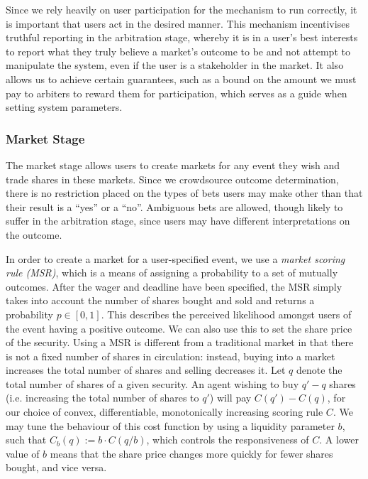 \documentclass[10pt,a4paper]{article}
\theoremstyle{plain}
\theoremstyle{definition}
\begin{document}
Since we rely heavily on user participation for the mechanism to run correctly,
it is important that users act in the desired manner. This mechanism
incentivises truthful reporting in the arbitration stage, whereby it is in a
user's best interests to report what they truly believe a market's outcome to
be and not attempt to manipulate the system, even if the user is a stakeholder
in the market. It also allows us to achieve certain guarantees, such as a bound
on the amount we must pay to arbiters to reward them for participation, which
serves as a guide when setting system parameters.

\subsubsection{Market Stage}

The market stage allows users to create markets for any event they wish and
trade shares in these markets. Since we crowdsource outcome determination,
there is no restriction placed on the types of bets users may make other than
that their result is a ``yes'' or a ``no''. Ambiguous bets are allowed, though
likely to suffer in the arbitration stage, since users may have different
interpretations on the outcome.

In order to create a market for a user-specified event, we use a \emph{market
scoring rule (MSR)}, which is a means of assigning a probability to a set of
mutually outcomes. After the wager and deadline have been specified, the MSR
simply takes into account the number of shares bought and sold and returns a
probability $p \in [0,1]$. This describes the perceived likelihood amongst
users of the event having a positive outcome. We can also use this to set the
share price of the security.  Using a MSR is different from a traditional
market in that there is not a fixed number of shares in circulation: instead,
buying into a market increases the total number of shares and selling decreases
it. Let $q$ denote the total number of shares of a given security. An agent
wishing to buy $q'-q$ shares (i.e. increasing the total number of shares to
$q'$) will pay $C(q')-C(q)$, for our choice of convex, differentiable,
monotonically increasing scoring rule $C$. We may tune the behaviour of this
cost function by using a liquidity parameter $b$, such that $C_b(q) := b \cdot
C(q/b)$, which controls the responsiveness of $C$. A lower value of $b$ means
that the share price changes more quickly for fewer shares bought, and vice
versa.
\end{document}
